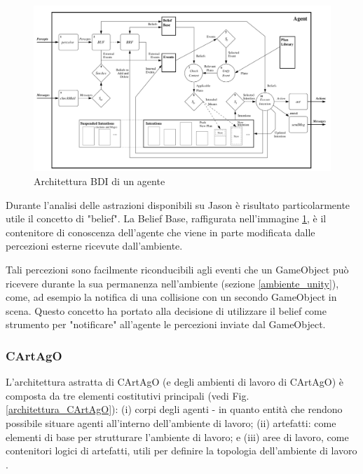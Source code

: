 \begin{figure}[H]
\centering
\includegraphics[width=\textwidth]{figures/Agent_BDI_Lifecycle.png}
\caption{Architettura BDI di un agente \cite{jason-book}}
\label{architettura_BDI_agente}
\end{figure}

Durante l'analisi delle astrazioni disponibili su Jason è risultato particolarmente utile il concetto di "belief". La Belief Base, raffigurata nell'immagine \ref{architettura_BDI_agente}, è il contenitore di conoscenza dell'agente che viene in parte modificata dalle percezioni esterne ricevute dall'ambiente. 

\medskip

Tali percezioni sono facilmente riconducibili agli eventi che un GameObject può ricevere durante la sua permanenza nell'ambiente (sezione \ref{ambiente_unity}), come, ad esempio la notifica di una collisione con un secondo GameObject in scena. Questo concetto ha portato alla decisione di utilizzare il belief come strumento per "notificare" all'agente le percezioni inviate dal GameObject.

\subsubsection{CArtAgO}

L'architettura astratta di CArtAgO (e degli ambienti di lavoro di CArtAgO) è composta da tre elementi costitutivi principali (vedi Fig. \ref{architettura_CArtAgO}): (i) corpi degli agenti - in quanto entità che rendono possibile situare agenti all'interno dell'ambiente di lavoro; (ii) artefatti: come elementi di base per strutturare l'ambiente di lavoro; e (iii) aree di lavoro, come contenitori logici di artefatti, utili per definire la topologia dell'ambiente di lavoro \cite{cartago}.

